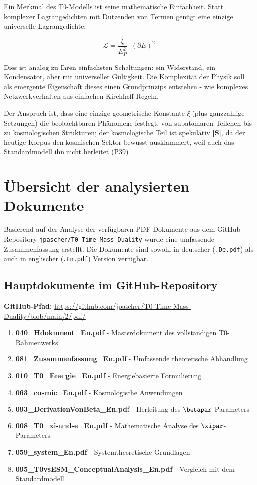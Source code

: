 Ein Merkmal des T0-Modells ist seine mathematische Einfachheit. Statt komplexer Lagrangedichten mit Dutzenden von Termen genügt eine einzige universelle Lagrangedichte:

$$\mathcal{L} = \frac{\xi}{E_P^2} \cdot (\partial E)^2$$

Dies ist analog zu Ihren einfachsten Schaltungen: ein Widerstand, ein Kondensator, aber mit universeller Gültigkeit. Die Komplexität der Physik soll als emergente Eigenschaft dieses einen Grundprinzips entstehen - wie komplexes Netzwerkverhalten aus einfachen Kirchhoff-Regeln.

Der Anspruch ist, dass eine einzige geometrische Konstante $\xi$ (plus ganzzahlige Setzungen) die beobachtbaren Phänomene festlegt, von subatomaren Teilchen bis zu kosmologischen Strukturen; der kosmologische Teil ist spekulativ \textbf{[S]}, da der heutige Korpus den kosmischen Sektor bewusst ausklammert, weil auch das Standardmodell ihn nicht herleitet (P39).	
\section{Übersicht der analysierten Dokumente}

Basierend auf der Analyse der verfügbaren PDF-Dokumente aus dem GitHub-Repository \texttt{jpascher/T0-Time-Mass-Duality} wurde eine umfassende Zusammenfassung erstellt. Die Dokumente sind sowohl in deutscher (\texttt{.De.pdf}) als auch in englischer (\texttt{.En.pdf}) Version verfügbar.

\subsection{Hauptdokumente im GitHub-Repository}

\textbf{GitHub-Pfad:} \url{https://github.com/jpascher/T0-Time-Mass-Duality/blob/main/2/pdf/}

\begin{enumerate}
	\item \textbf{040\_Hdokument\_En.pdf} - Masterdokument des vollständigen T0-Rahmenwerks
	\item \textbf{081\_Zusammenfassung\_En.pdf} - Umfassende theoretische Abhandlung
	\item \textbf{010\_T0\_Energie\_En.pdf} - Energiebasierte Formulierung
	\item \textbf{063\_cosmic\_En.pdf} - Kosmologische Anwendungen
	\item \textbf{093\_DerivationVonBeta\_En.pdf} - Herleitung des $\betapar$-Parameters
	\item \textbf{008\_T0\_xi-und-e\_En.pdf} - Mathematische Analyse des $\xipar$-Parameters
	\item \textbf{059\_system\_En.pdf} - Systemtheoretische Grundlagen
	\item \textbf{095\_T0vsESM\_ConceptualAnalysis\_En.pdf} - Vergleich mit dem Standardmodell
\end{enumerate}

